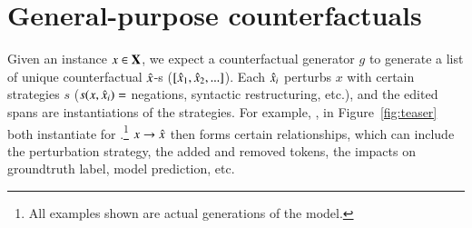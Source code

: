 \section{General-purpose counterfactuals}

% 
Given an instance $x \in \mathbf{X}$, we expect a counterfactual generator $g$ to generate a list of unique counterfactual $\hat{x}$-s ($[\hat{x}_1, \hat{x}_2, ...]$).
Each $\hat{x}_i$ perturbs $x$ with certain strategies $s$ ($s(x, \hat{x}_i)=$ negations, syntactic restructuring, etc.), and the edited spans are instantiations of the strategies.
For example, ,  in Figure~\ref{fig:teaser} both instantiate for .\footnote{All examples shown are actual generations of the model.}
$x\rightarrow \hat{x}$ then forms certain relationships, which can include the perturbation strategy, the added and removed tokens, the impacts on groundtruth label, model prediction, etc.

